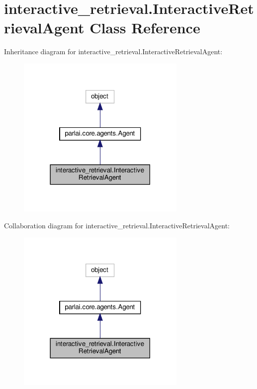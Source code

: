 \hypertarget{classinteractive__retrieval_1_1InteractiveRetrievalAgent}{}\section{interactive\+\_\+retrieval.\+Interactive\+Retrieval\+Agent Class Reference}
\label{classinteractive__retrieval_1_1InteractiveRetrievalAgent}


Inheritance diagram for interactive\+\_\+retrieval.\+Interactive\+Retrieval\+Agent\+:
\nopagebreak
\begin{figure}[H]
\begin{center}
\leavevmode
\includegraphics[width=230pt]{classinteractive__retrieval_1_1InteractiveRetrievalAgent__inherit__graph}
\end{center}
\end{figure}


Collaboration diagram for interactive\+\_\+retrieval.\+Interactive\+Retrieval\+Agent\+:
\nopagebreak
\begin{figure}[H]
\begin{center}
\leavevmode
\includegraphics[width=230pt]{classinteractive__retrieval_1_1InteractiveRetrievalAgent__coll__graph}
\end{center}
\end{figure}
